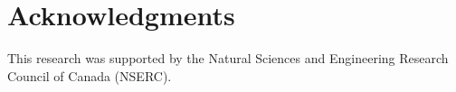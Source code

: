 \section*{Acknowledgments}\label{acknowledgments}

This research was supported by the Natural Sciences and Engineering Research Council of Canada (NSERC).



\address{%
Zeinab Mashreghi\\
University of Winnipeg\\%
Department of Mathematics and Statistics\\ Winnipeg, Canada\\
%
%
\textit{ORCID: \href{https://orcid.org/0000-0003-0563-0792}{0000-0003-0563-0792}}\\%
\href{mailto:z.mashreghi@uwinnipeg.ca}{\nolinkurl{z.mashreghi@uwinnipeg.ca}}%
}
